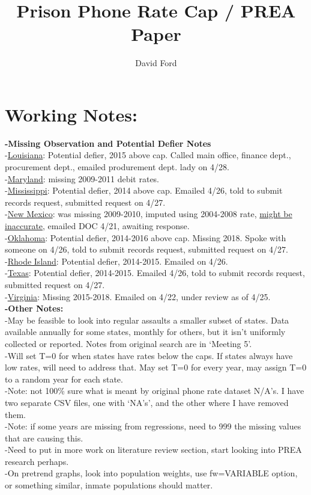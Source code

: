 \documentclass[10pt,a4paper]{article}
\begin{document}
\title{Prison Phone Rate Cap / PREA Paper}
\author{David Ford}
\maketitle

\section{Working Notes:}
\textbf{-Missing Observation and Potential Defier Notes} \\ 
-\underline{Louisiana}: Potential defier, 2015 above cap. Called main office, finance dept., procurement dept., emailed produrement dept. lady on 4/28. \\ 
-\underline{Maryland}: missing 2009-2011 debit rates. \\ 
-\underline{Mississippi}: Potential defier, 2014 above cap. Emailed 4/26, told to submit records request, submitted request on 4/27. \\
-\underline{New Mexico}: was missing 2009-2010, imputed using 2004-2008 rate, \underline{might be inaccurate}, emailed DOC 4/21,  awaiting response. \\
-\underline{Oklahoma}: Potential defier, 2014-2016 above cap. Missing 2018. Spoke with someone on 4/26, told to submit records request, submitted request on 4/27. \\
-\underline{Rhode Island}: Potential defier, 2014-2015. Emailed on 4/26. \\
-\underline{Texas}: Potential defier, 2014-2015. Emailed 4/26, told to submit records request, submitted request on 4/27. \\
-\underline{Virginia}: Missing 2015-2018. Emailed on 4/22, under review as of 4/25. \\

\noindent \textbf{-Other Notes:} \\
-May be feasible to look into regular assaults a smaller subset of states. Data available annually for some states, monthly for others, but it isn't uniformly collected or reported. Notes from original search are in `Meeting 5'. \\
-Will set T=0 for when states have rates below the caps. If states always have low rates, will need to address that. May set T=0 for every year, may assign T=0 to a random year for each state. \\ 
-Note: not 100\% sure what is meant by original phone rate dataset N/A's. I have two separate CSV files, one with `NA's', and the other where I have removed them. \\
-Note: if some years are missing from regressions, need to 999 the missing values that are causing this. \\
-Need to put in more work on literature review section, start looking into PREA research perhaps. \\
-On pretrend graphs, look into population weights, use fw=VARIABLE option, or something similar, inmate populations should matter. \\
\end{document}
